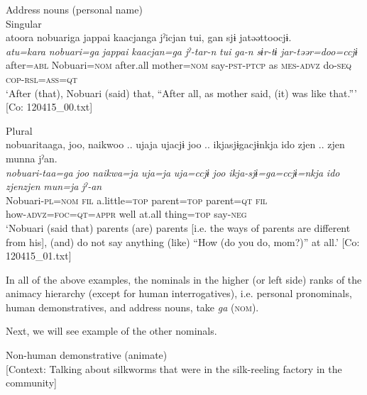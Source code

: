   Address nouns (personal name)\\

\ex  Singular\\

{\TM}
\glll atoora  nobuariga  jappai  {\textbar}kaacjan{\textbar}ga  jˀicjan   tui,  gan  sjɨ  jatəəttoocjɨ.\\
      \textit{atu=kara}  \textit{nobuari=ga}  \textit{jappai}  \textit{kaacjan=ga}  \textit{jˀ-tar-n}   \textit{tui}  \textit{ga-n}  \textit{sɨr-tɨ}  \textit{jar-təər=doo=ccjɨ}\\
      after=\textsc{abl}  Nobuari=\textsc{nom}  after.all  mother=\textsc{nom}  say-\textsc{pst}-\textsc{ptcp}      as  \textsc{mes}-\textsc{advz}  do-\textsc{seq}  \textsc{cop}-\textsc{rsl}=\textsc{ass}=\textsc{qt}\\
\glt ‘After (that), Nobuari (said) that, “After all, as mother said, (it) was like that.”’ [Co: 120415\_00.txt]

\ex  Plural\\

{\TM}
\glll nobuaritaaga,  joo,  naikwoo ..  ujaja  ujacjɨ  joo ..   ikjasjɨgacjɨnkja  ido  zjen .. zjen  munna  jˀan.\\
      \textit{nobuari-taa=ga}  \textit{joo}  \textit{naikwa=ja}  \textit{uja=ja}  \textit{uja=ccjɨ}  \textit{joo}  \textit{ikja-sjɨ=ga=ccjɨ=nkja}  \textit{ido}  \textit{zjenzjen}  \textit{mun=ja}  \textit{jˀ-an}\\
      Nobuari-\textsc{pl}=\textsc{nom}  \textsc{fil}  a.little=\textsc{top}  parent=\textsc{top}  parent=\textsc{qt}  \textsc{fil}\\
      how-\textsc{advz}=\textsc{foc}=\textsc{qt}=\textsc{appr}  well  at.all  thing=\textsc{top}  say-\textsc{neg}\\
\glt ‘Nobuari (said that) parents (are) parents [i.e. the ways of parents are different from his], (and) do not say anything (like) “How (do you do, mom?)” at all.’ [Co: 120415\_01.txt]
\z
\z

In all of the above examples, the nominals in the higher (or left side) ranks of the animacy hierarchy (except for human interrogatives), i.e. personal pronominals, human demonstratives, and address nouns, take \textit{ga} (\textsc{nom}).

  Next, we will see example of the other nominals.

\ea\label{ex:6-118}
\ea Non-human demonstrative (animate)\\{}
[Context: Talking about silkworms that were in the silk-reeling factory in the community]

